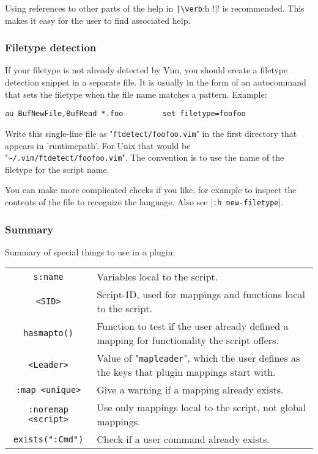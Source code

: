 Using references to other parts of the help in \verb!|\verb!:h !|! is recommended.
This makes it easy for the user to find associated help.
\subsubsection{Filetype detection}
\label{plugin-filetype}
If your filetype is not already detected by Vim, you should create a filetype detection snippet in a separate file.
It is usually in the form of an autocommand that sets the filetype when the file name matches a pattern.
Example:

\begin{Verbatim}[samepage=true]
 au BufNewFile,BufRead *.foo         set filetype=foofoo
\end{Verbatim}

Write this single-line file as "\verb!ftdetect/foofoo.vim!" in the first directory that appears in 'runtimepath'.
For Unix that would be "\verb!~/.vim/ftdetect/foofoo.vim!".
The convention is to use the name of the filetype for the script name.

You can make more complicated checks if you like, for example to inspect the contents of the file to recognize the language.
Also see |\verb!:h new-filetype!|.
\subsubsection{Summary}
\label{plugin-special}

Summary of special things to use in a plugin:
\begin{center} \begin{tabular}{c l}
				\verb!s:name! & Variables local to the script. \\
				\verb!<SID>! & Script-ID, used for mappings and functions local to the script. \\
				\verb!hasmapto()! & Function to test if the user already defined a mapping for functionality the script offers. \\
				\verb!<Leader>! & Value of "\verb!mapleader!", which the user defines as the keys that plugin mappings start with. \\
				\verb!:map <unique>! & Give a warning if a mapping already exists. \\
				\verb!:noremap <script>! & Use only mappings local to the script, not global mappings. \\
				\verb!exists(":Cmd")! & Check if a user command already exists. \\
\end{tabular} \end{center}
